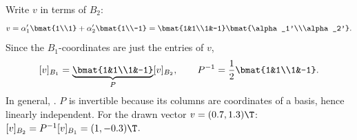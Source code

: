 \begin{insight}
Write $v$ in terms of $B_2$:
\[ v=\alpha_1'\bmat{1\\1}+\alpha_2'\bmat{1\\-1}=\bmat{1&1\\1&-1}\bmat{\alpha_1'\\\alpha_2'}. \]
Since the $B_1$-coordinates are just the entries of $v$,
\[
[v]_{B_1}=\underbrace{\bmat{1&1\\1&-1}}_{P}[v]_{B_2},
\qquad
P^{-1}=\frac12\bmat{1&1\\1&-1}.
\]
In general, . $P$ is invertible because its columns are coordinates of a basis, hence linearly independent. For the drawn vector $v=(0.7,1.3)\T$: $[v]_{B_2}=P^{-1}[v]_{B_1}=(1,-0.3)\T$.
\end{insight}

